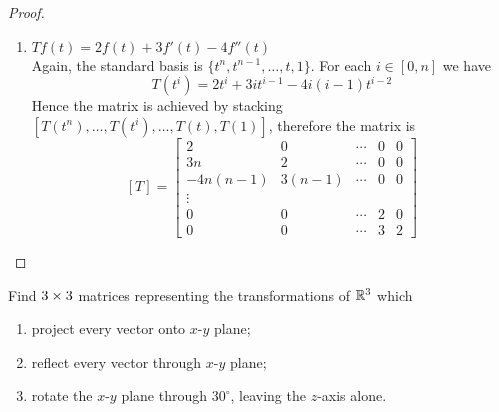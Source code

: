 \begin{proof}
\begin{enumerate}
      \newpage
    \item $Tf(t)=2f(t)+3f'(t)-4f''(t)$\\
      Again, the standard basis is $\{t^n,t^{n-1},\dots,t,1\}$. For
      each $i\in [0,n]$ we have
      \[T(t^i)=2t^i+3it^{i-1}-4i(i-1)t^{i-2}\]
      Hence the matrix is achieved by stacking 
      $[T(t^n),\dots,T(t^i),\dots,T(t),T(1)]$, therefore the matrix is
      \[ [T]=
        \begin{bmatrix*}
          2        &0      &\cdots &0   &0\\
          3n       &2      &\cdots &0   &0\\
          -4n(n-1) &3(n-1) &\cdots &0   &0\\
          \vdots \\
          0        &0      &\cdots &2   &0\\
          0        &0      &\cdots &3   &2
        \end{bmatrix*}
      \]
  \end{enumerate}
\end{proof}
\begin{exercise}
  Find $3\times3$ matrices representing the transformations of $\mathbb{R}^3$ which
  \begin{enumerate}
    \item project every vector onto $x$-$y$ plane;
    \item reflect every vector through $x$-$y$ plane;
    \item rotate the $x$-$y$ plane through $30^\circ$, leaving the
      $z$-axis alone.
  \end{enumerate}
\end{exercise}
